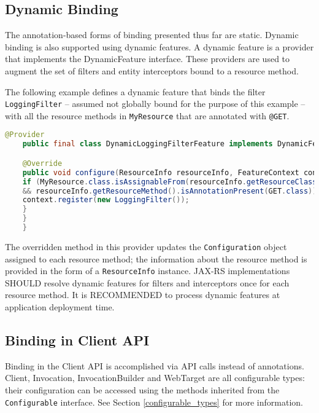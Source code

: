 \subsection{Dynamic Binding}
\label{dynamic_binding}

The annotation-based forms of binding presented thus far are static. Dynamic binding is also supported using dynamic
features. A dynamic feature is a provider that implements the DynamicFeature interface. These providers are used to
augment the set of filters and entity interceptors bound to a resource method.

The following example defines a dynamic feature that binds the filter \lstinline{LoggingFilter} -- assumed not globally
bound for the purpose of this example -- with all the resource methods in \lstinline{MyResource} that are annotated with
\lstinline{@GET}.

\begin{lstlisting}[language=Java]
    @Provider
    public final class DynamicLoggingFilterFeature implements DynamicFeature {

    @Override
    public void configure(ResourceInfo resourceInfo, FeatureContext context) {
    if (MyResource.class.isAssignableFrom(resourceInfo.getResourceClass())
    && resourceInfo.getResourceMethod().isAnnotationPresent(GET.class)) {
    context.register(new LoggingFilter());
    }
    }
    }
\end{lstlisting}

The overridden method in this provider updates the \lstinline{Configuration} object assigned to each resource method;
the information about the resource method is provided in the form of a \lstinline{ResourceInfo} instance.
JAX-RS implementations SHOULD resolve dynamic features for filters and interceptors once for each resource method. It is
RECOMMENDED to process dynamic features at application deployment time.

\subsection{Binding in Client API}
\label{binding_in_client_api}

Binding in the Client API is accomplished via API calls instead of annotations. Client, Invocation, InvocationBuilder
and WebTarget are all configurable types: their configuration can be accessed using the methods inherited from the
\lstinline{Configurable} interface. See Section \ref{configurable_types} for more information.

